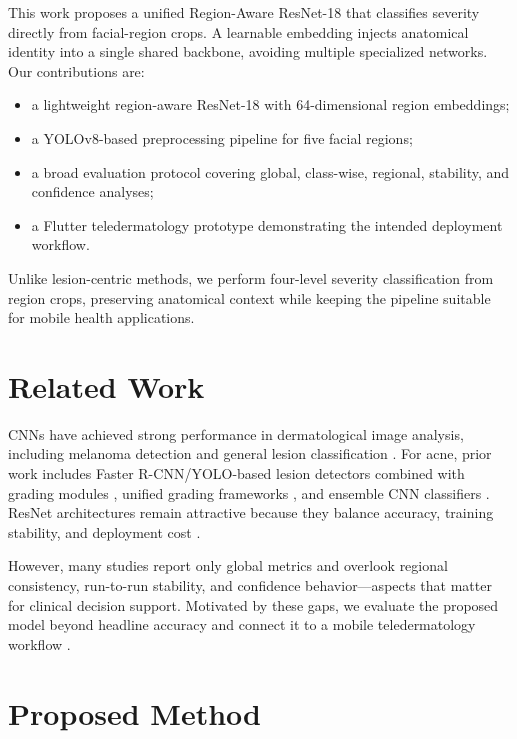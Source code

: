 \documentclass[10pt,conference]{IEEEtran}
\begin{document}
This work proposes a unified Region-Aware ResNet-18 that classifies severity directly from facial-region crops. A learnable embedding injects anatomical identity into a single shared backbone, avoiding multiple specialized networks. Our contributions are:
\begin{itemize}
\item a lightweight region-aware ResNet-18 with 64-dimensional region embeddings;
\item a YOLOv8-based preprocessing pipeline for five facial regions;
\item a broad evaluation protocol covering global, class-wise, regional, stability, and confidence analyses;
\item a Flutter teledermatology prototype demonstrating the intended deployment workflow.
\end{itemize}

Unlike lesion-centric methods, we perform four-level severity classification from region crops, preserving anatomical context while keeping the pipeline suitable for mobile health applications.

\section{Related Work}
CNNs have achieved strong performance in dermatological image analysis, including melanoma detection and general lesion classification \cite{nasr2016melanoma,brinker2019cnn}. For acne, prior work includes Faster R-CNN/YOLO-based lesion detectors combined with grading modules \cite{huynh2022automatic}, unified grading frameworks \cite{lin2022kieglfn}, and ensemble CNN classifiers \cite{liu2022acnegrader,shen2018acne,wu2019joint}. ResNet architectures remain attractive because they balance accuracy, training stability, and deployment cost \cite{he2016resnet}.

However, many studies report only global metrics and overlook regional consistency, run-to-run stability, and confidence behavior---aspects that matter for clinical decision support. Motivated by these gaps, we evaluate the proposed model beyond headline accuracy and connect it to a mobile teledermatology workflow \cite{byamba2015mobile}.

\section{Proposed Method}
\end{document}

